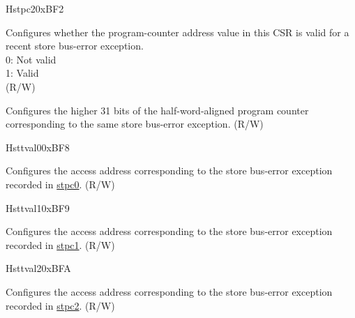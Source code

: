 \begin{register}{H}{stpc2}{0xBF2}\label{regdesc:STPC2}%
%
%
\regnewline%
\begin{regdesc}\begin{reglist}
\label{fielddesc:STPC2_VLD}\item [VLD] Configures whether the program-counter address value in this CSR is valid for a recent store bus-error exception.\\
0: Not valid\\
1: Valid\\
(R/W)
\label{fielddesc:STPC2_ADDR}\item [{ADDR}] Configures the higher 31 bits of the half-word-aligned program counter corresponding to the same store bus-error exception. (R/W)
\end{reglist}\end{regdesc}
\end{register}

\begin{register}{H}{sttval0}{0xBF8}\label{regdesc:STTVAL0}%
%
\regnewline%
\begin{regdesc}\begin{reglist}
\label{fielddesc:STTVAL0_ADDR}\item [{ADDR}] Configures the access address corresponding to the store bus-error exception recorded in \hyperref[regdesc:STPC0]{stpc0}. (R/W)
\end{reglist}\end{regdesc}
\end{register}

\begin{register}{H}{sttval1}{0xBF9}\label{regdesc:STTVAL1}%
%
\regnewline%
\begin{regdesc}\begin{reglist}
\label{fielddesc:STTVAL1_ADDR}\item [{ADDR}] Configures the access address corresponding to the store bus-error exception recorded in \hyperref[regdesc:STPC1]{stpc1}. (R/W)
\end{reglist}\end{regdesc}
\end{register}

\begin{register}{H}{sttval2}{0xBFA}\label{regdesc:STTVAL2}%
%
\regnewline%
\begin{regdesc}\begin{reglist}
\label{fielddesc:STTVAL2_ADDR}\item [{ADDR}] Configures the access address corresponding to the store bus-error exception recorded in \hyperref[regdesc:STPC2]{stpc2}. (R/W)
\end{reglist}\end{regdesc}
\end{register}
